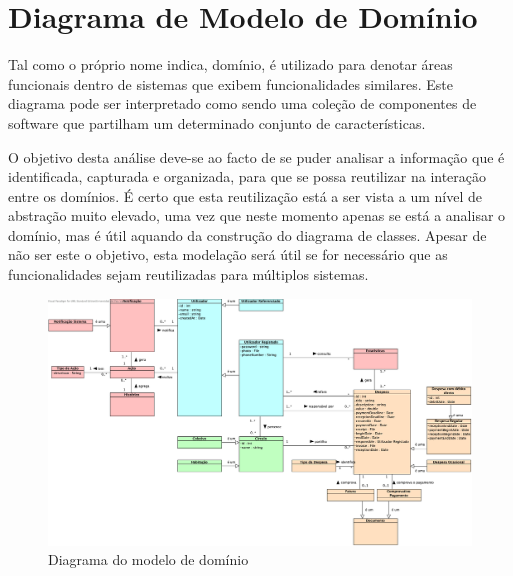 \section{Diagrama de Modelo de Domínio}

Tal como o próprio nome indica, domínio, é utilizado para denotar áreas funcionais dentro de sistemas que exibem funcionalidades similares. Este diagrama pode ser interpretado como sendo uma coleção de componentes de software que partilham um determinado conjunto de características.

O objetivo desta análise deve-se ao facto de se puder analisar a informação que é identificada, capturada e organizada, para que se possa reutilizar na interação entre os domínios. É certo que esta reutilização está a ser vista a um nível de abstração muito elevado, uma vez que neste momento apenas se está a analisar o domínio, mas é útil aquando da construção do diagrama de classes. Apesar de não ser este o objetivo, esta modelação será útil se for necessário que as funcionalidades sejam reutilizadas para múltiplos sistemas. \\

\begin{figure}[ht]
\centerline{\includegraphics[width=1\textwidth]{images/modeling/modeloDominio}}
\caption{Diagrama do modelo de domínio}
\label{fig:domainModel}
\end{figure}

